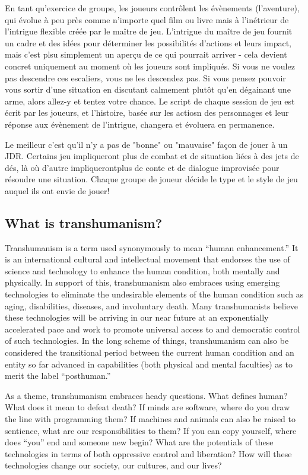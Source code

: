 En tant qu'exercice de groupe, les joueurs contrôlent les évènements (l'aventure), qui évolue à peu près comme n'importe quel film ou livre mais à l'inétrieur de l'intrigue flexible créée par le maître de jeu. L'intrigue du maître de jeu fournit un cadre et des idées pour déterminer les possibilités d'actions et leurs impact, mais c'est plsu simplement un aperçu de ce qui pourrait arriver - cela devient concret uniquement au moment où les joueurs sont impliqués. Si vous ne voulez pas descendre ces escaliers, vous ne les descendez pas. Si vous pensez pouvoir vous sortir d'une situation en discutant calmement plutôt qu'en dégainant une arme, alors allez-y et tentez votre chance. Le script de chaque session de jeu est écrit par les joueurs, et l'histoire, basée sur les actiosn des personnages et leur réponse aux évènement de l'intrigue, changera et évoluera en permanence. 

Le meilleur c'est qu'il n'y a pas de "bonne" ou "mauvaise" façon de jouer à un JDR. Certains jeu impliqueront plus de combat et de situation liées à des jets de dés, là où d'autre impliquerontplus de conte et de dialogue improvisée pour résoudre une situation. Chaque groupe de joueur décide le type et le style de jeu auquel ils ont envie de jouer! 



\subsection{What is transhumanism?} \label{sec:what-transhumanism} 

Transhumanism is a term used synonymously to mean ``human enhancement.'' It is an international cultural and intellectual movement that endorses the use of science and technology to enhance the human condition, both mentally and physically. In support of this, transhumanism also embraces using emerging technologies to eliminate the undesirable elements of the human condition such as aging, disabilities, diseases, and involuntary death. Many transhumanists believe these technologies will be arriving in our near future at an exponentially accelerated pace and work to promote universal access to and democratic control of such technologies. In the long scheme of things, transhumanism can also be considered the transitional period between the current human condition and an entity so far advanced in capabilities (both physical and mental faculties) as to merit the label ``posthuman.'' 

As a theme, transhumanism embraces heady questions. What defines human? What does it mean to defeat death? If minds are software, where do you draw the line with programming them? If machines and animals can also be raised to sentience, what are our responsibilities to them? If you can copy yourself, where does ``you'' end and someone new begin? What are the potentials of these technologies in terms of both oppressive control and liberation? How will these technologies change our society, our cultures, and our lives? 



